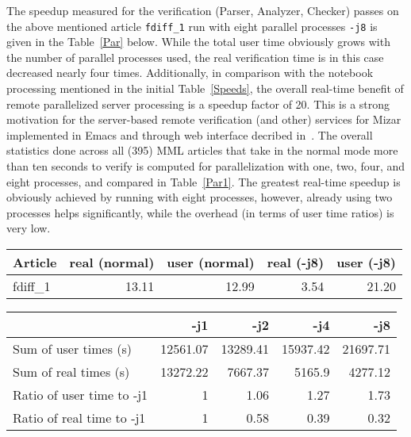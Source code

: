 \documentclass{llncs}
\begin{document}
The speedup measured for the verification (Parser, Analyzer, Checker)
passes on the above mentioned article {\tt fdiff\_1} run with eight parallel processes
{\tt -j8} is given in the Table~\ref{Par} below. While the total user
time obviously grows with the number of parallel processes used, the
real verification time is in this case decreased nearly four
times. Additionally, in comparison with the notebook processing
mentioned in the initial Table~\ref{Speeds}, the overall real-time
benefit of remote parallelized server processing is a speedup factor
of 20. This is a strong motivation for the server-based remote
verification (and other) services for Mizar implemented in Emacs and
through web interface decribed in~\cite{UrbanS10}.
The overall statistics done
across all (395) MML articles that take in the normal mode more than
ten seconds to verify is computed for parallelization with one, two,
four, and eight processes, and compared in Table~\ref{Par1}. The
greatest real-time speedup is obviously achieved by running with eight
processes, however, already using two processes helps significantly,
while the overhead (in terms of user time ratios) is very low.
\vspace{-3mm}
\begin{table*}[htbp]
  \caption{Comparison of the verification speed on article {\tt fdiff\_1} run in the normal mode and in the parallel mode, with eight parallel processes ({\tt -j8})}
\begin{center}
  \begin{tabular}{|l|r|r|r|r|}
    \hline
    Article&real (normal)&user (normal)&real (-j8)&user (-j8)\\
    \hline    
    fdiff\_1&13.11&12.99&3.54&21.20\\
    \hline    
  \end{tabular}
\end{center}
\label{Par}
\end{table*}
\vspace{-1.5cm}
\begin{table*}[htbp]
  \caption{Comparison of the verification speeds on 395 slow MML articles run with one, two, four, and eight parallel processes}
\begin{center}
  \begin{tabular}{|l|r|r|r|r|}
    \hline
    & -j1 & -j2 & -j4 & -j8 \\
\hline
    Sum of user times (s)   & 12561.07 & 13289.41 & 15937.42 & 21697.71 \\
\hline
    Sum of real times (s)   & 13272.22 &  7667.37 & 5165.9 & 4277.12 \\
\hline
    Ratio of user time to -j1 & 1 & 1.06 & 1.27 & 1.73\\
\hline
    Ratio of real time to -j1  & 1 & 0.58 & 0.39 & 0.32 \\
    \hline    
  \end{tabular}
\end{center}
\label{Par1}
\end{table*}
\end{document}
